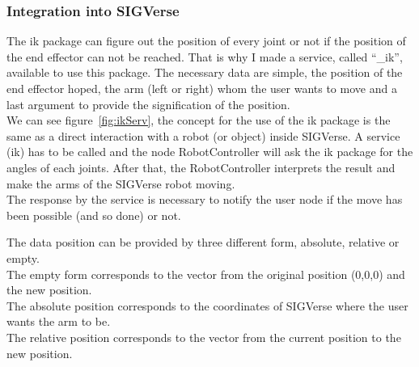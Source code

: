 \subsubsection{Integration into SIGVerse}\label{subsubsec:integIKSIG}
The ik package can figure out the position of every joint or not if the position of the end effector can not be reached. That is why I made a service, called ``\_ik'', available to use this package. The necessary data are simple, the position of the end effector hoped, the arm (left or right) whom the user wants to move and a last argument to provide the signification of the position.\\

We can see figure~\ref{fig:ikServ}, the concept for the use of the ik package is the same as a direct interaction with a robot (or object) inside SIGVerse. A service (ik) has to be called and the node RobotController will ask the ik package for the angles of each joints. After that, the RobotController interprets the result and make the arms of the SIGVerse robot moving.\\
The response by the service is necessary to notify the user node if the move has been possible (and so done) or not.

\noindent\begin{minipage}{\linewidth}%
\label{fig:ikServ}%
\end{minipage}

The data position can be provided by three different form, absolute, relative or empty.\\
The empty form corresponds to the vector from the original position (0,0,0) and the new position.\\
The absolute position corresponds to the coordinates of SIGVerse where the user wants the arm to be.\\
The relative position corresponds to the vector from the current position to the new position.\\

